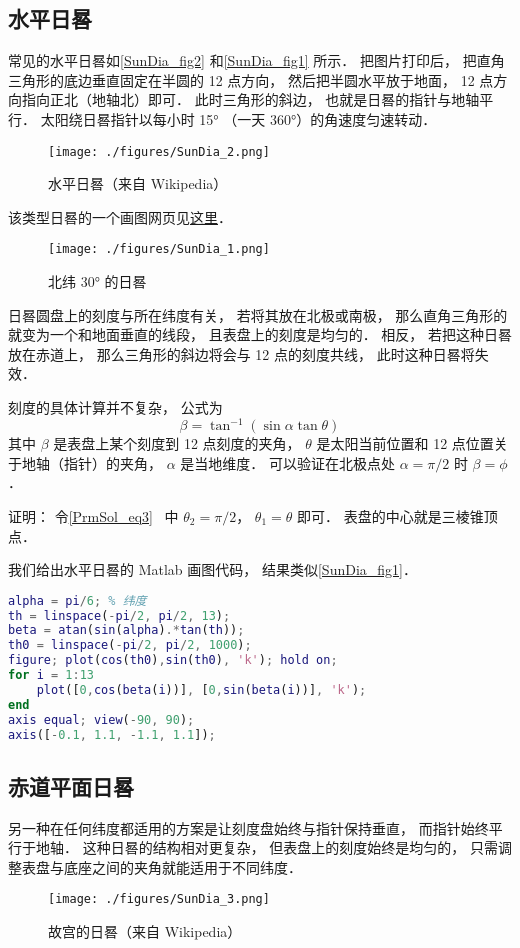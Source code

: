 
\begin{issues}
\end{issues}

\subsection{水平日晷}

常见的水平日晷如\autoref{SunDia_fig2} 和\autoref{SunDia_fig1} 所示． 把图片打印后， 把直角三角形的底边垂直固定在半圆的 12 点方向， 然后把半圆水平放于地面， 12 点方向指向正北（地轴北）即可． 此时三角形的斜边， 也就是日晷的指针与地轴平行． 太阳绕日晷指针以每小时 15° （一天 360°）的角速度匀速转动．

\begin{figure}[ht]
\centering
\texttt{[image: ./figures/SunDia\_2.png]}
\caption{水平日晷（来自 Wikipedia）} \label{SunDia_fig2}
\end{figure}
该类型日晷的一个画图网页见\href{https://www.blocklayer.com/sundial.aspx}{这里}．
\begin{figure}[ht]
\centering
\texttt{[image: ./figures/SunDia\_1.png]}
\caption{北纬 30° 的日晷} \label{SunDia_fig1}
\end{figure}

日晷圆盘上的刻度与所在纬度有关， 若将其放在北极或南极， 那么直角三角形的就变为一个和地面垂直的线段， 且表盘上的刻度是均匀的． 相反， 若把这种日晷放在赤道上， 那么三角形的斜边将会与 12 点的刻度共线， 此时这种日晷将失效．

刻度的具体计算并不复杂， 公式为
\begin{equation}
\beta = \tan^{-1}(\sin\alpha \tan \theta)
\end{equation}
其中 $\beta$ 是表盘上某个刻度到 12 点刻度的夹角， $\theta$ 是太阳当前位置和 12 点位置关于地轴（指针）的夹角， $\alpha$ 是当地维度． 可以验证在北极点处 $\alpha = \pi/2$ 时 $\beta = \phi$．

证明： 令\autoref{PrmSol_eq3}~ 中 $\theta_2 = \pi/2$， $\theta_1 = \theta$ 即可． 表盘的中心就是三棱锥顶点．

我们给出水平日晷的 Matlab 画图代码， 结果类似\autoref{SunDia_fig1}．
\begin{lstlisting}[language=matlab, caption=sunDial.m]
alpha = pi/6; % 纬度
th = linspace(-pi/2, pi/2, 13);
beta = atan(sin(alpha).*tan(th));
th0 = linspace(-pi/2, pi/2, 1000);
figure; plot(cos(th0),sin(th0), 'k'); hold on;
for i = 1:13
    plot([0,cos(beta(i))], [0,sin(beta(i))], 'k');
end
axis equal; view(-90, 90);
axis([-0.1, 1.1, -1.1, 1.1]);
\end{lstlisting}

\subsection{赤道平面日晷}
另一种在任何纬度都适用的方案是让刻度盘始终与指针保持垂直， 而指针始终平行于地轴． 这种日晷的结构相对更复杂， 但表盘上的刻度始终是均匀的， 只需调整表盘与底座之间的夹角就能适用于不同纬度．
\begin{figure}[ht]
\centering
\texttt{[image: ./figures/SunDia\_3.png]}
\caption{故宫的日晷（来自 Wikipedia）} \label{SunDia_fig3}
\end{figure}

